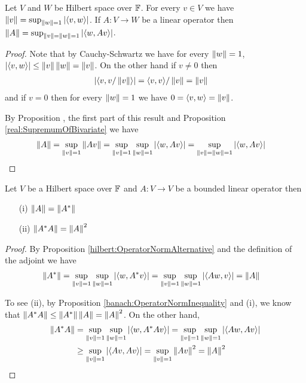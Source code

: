 \begin{prop}\label{hilbert:OperatorNormAlternative}Let $V$ and $W$ be Hilbert space over $\mathbb{F}$.   For every $v \in V$ we have $\left \lVert v \right \rVert = \sup_{\left \lVert w \right \rVert=1} \left \vert \langle v, w \rangle \right \vert$.  If $A : V \to W$ be a linear operator then $\left \lVert A \right \rVert = \sup_{\left \lVert v \right \rVert = \left \lVert w \right \rVert = 1} \left \vert \langle w, A v \rangle \right \vert$.
\end{prop}
\begin{proof}
Note that by Cauchy-Schwartz we have for every $\left \lVert w \right \rVert = 1$,$\left \vert \langle v, w \rangle \right \vert \leq \left \lVert v \right \rVert\left \lVert w \right \rVert = \left \lVert v \right \rVert$.  On the other hand if $v \neq 0$ then 
\begin{align*}
\left \vert \langle v, v/\left \lVert v \right \rVert \rangle \right \vert &= \langle v, v \rangle/\left \lVert v \right \rVert = \left \lVert v \right \rVert 
\end{align*}
and if $v = 0$ then for every $\left \lVert w \right \rVert = 1$ we have $0 = \langle v, w \rangle = \left \lVert v \right \rVert$.

By Proposition \label{banach:OperatorNormAlternative}, the first part of this result and Proposition \ref{real:SupremumOfBivariate} we have 
\begin{align*}
\left \lVert A \right \rVert &= \sup_{\left \lVert v \right \rVert=1} \left \lVert Av \right \rVert  = \sup_{\left \lVert v \right \rVert=1} \sup_{\left \lVert w \right \rVert=1} \left \vert \langle w, A v \rangle \right \vert = \sup_{\left \lVert v \right \rVert=\left \lVert w \right \rVert=1} \left \vert \langle w, A v \rangle \right \vert 
\end{align*}
\end{proof}

\begin{prop}\label{hilbert:NormOfAdjoint}Let $V$ be a Hilbert space over $\mathbb{F}$ and $A : V \to V$ be a bounded linear operator then
\begin{itemize}
\item[(i)] $\left \lVert A \right \rVert = \left \lVert {A}^* \right \rVert$
\item[(ii)] $\left \lVert {A}^* A \right \rVert = \left \lVert A \right \rVert^2$
\end{itemize}
\end{prop}
\begin{proof}
By Proposition \ref{hilbert:OperatorNormAlternative} and the definition of the adjoint we have
\begin{align*}
\left \lVert {A}^* \right \rVert &= \sup_{\left \lVert v \right \rVert=1} \sup_{\left \lVert w \right \rVert=1} \left \vert \langle w, {A}^* v \rangle \right \vert = \sup_{\left \lVert v \right \rVert=1} \sup_{\left \lVert w \right \rVert=1} \left \vert \langle Aw,  v \rangle \right \vert = \left \lVert A \right \rVert
\end{align*}

To see (ii), by Proposition \ref{banach:OperatorNormInequality} and (i), we know that $\left \lVert {A}^* A \right \rVert \leq \left \lVert {A}^* \right \rVert \left \lVert A \right \rVert = \left \lVert A \right \rVert^2$.  On the other hand,
\begin{align*}
\left \lVert {A}^* A \right \rVert  &= \sup_{\left \lVert v \right \rVert=1} \sup_{\left \lVert w \right \rVert=1} \left \vert \langle w, {A}^* A v \rangle \right \vert = \sup_{\left \lVert v \right \rVert=1} \sup_{\left \lVert w \right \rVert=1} \left \vert \langle A w, A v \rangle \right \vert \\
&\geq \sup_{\left \lVert v \right \rVert = 1} \left \vert \langle A v, A v \rangle \right \vert = \sup_{\left \lVert v \right \rVert = 1} \left \lVert Av \right \rVert^2 = \left \lVert A \right \rVert^2
\end{align*}
\end{proof}

